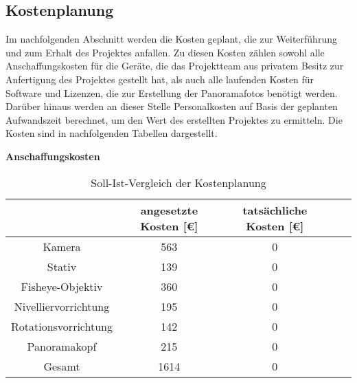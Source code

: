 \subsection{Kostenplanung}
\label{sec:Kostenplanung}

Im nachfolgenden Abschnitt werden die Kosten geplant, die zur Weiterführung und
zum Erhalt des Projektes anfallen. Zu diesen Kosten zählen sowohl alle
Anschaffungskosten für die Geräte, die das Projektteam aus privatem Besitz zur
Anfertigung des Projektes gestellt hat, als auch alle laufenden Kosten für
Software und Lizenzen, die zur Erstellung der Panoramafotos benötigt werden.
Darüber hinaus werden an dieser Stelle Personalkosten auf Basis der geplanten
Aufwandszeit berechnet, um den Wert des erstellten Projektes zu
ermitteln.%
Die Kosten sind in nachfolgenden Tabellen dargestellt. 

\textbf{Anschaffungskosten}

\begin{table}[h]
\centering
\begin{tabular}{ccccl}
\hline
\multicolumn{1}{l}{}      & angesetzte Kosten {[}€{]} & tatsächliche Kosten {[}€{]} \\ \hline
Kamera                    & 563\footnotemark[1]           & 0                    \\ \hline
Stativ                    & 139\footnotemark[2]           & 0                    \\ \hline
Fisheye-Objektiv          & 360\footnotemark[3]           & 0                    \\ \hline
Nivelliervorrichtung      & 195\footnotemark[4]           & 0                    \\ \hline
Rotationsvorrichtung      & 142\footnotemark[5]           & 0                    \\ \hline
Panoramakopf              & 215\footnotemark[6]           & 0                    \\ \hline

Gesamt                    & 1614           & 0                    \\ \hline
\end{tabular}
\caption{Soll-Ist-Vergleich der Kostenplanung}%
\label{tab:KostenaufstellungAnschaffung}%
\end{table}



